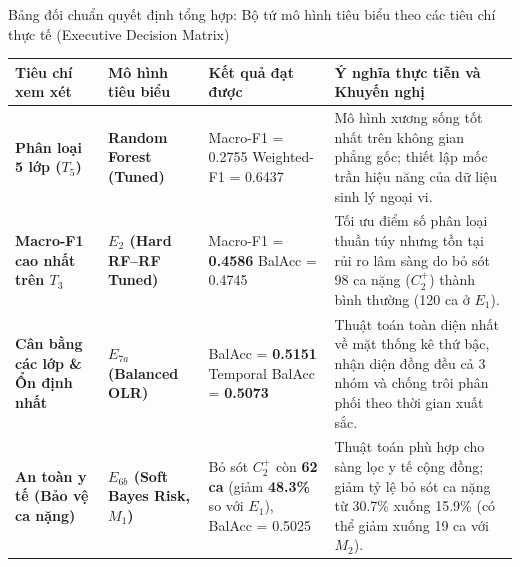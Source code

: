 \begin{table}{Bảng đối chuẩn quyết định tổng hợp: Bộ tứ mô hình tiêu biểu theo các tiêu chí thực tế (Executive Decision Matrix)}
\centering
\footnotesize
\setlength{\tabcolsep}{4pt}
\label{tab:executive-decision-matrix}
\begin{tabularx}{\textwidth}{p{3.2cm} p{3.0cm} p{3.2cm} X}
\toprule
\textbf{Tiêu chí xem xét} & \textbf{Mô hình tiêu biểu} & \textbf{Kết quả đạt được} & \textbf{Ý nghĩa thực tiễn và Khuyến nghị} \\
\midrule
\textbf{Phân loại 5 lớp ($T_5$)} & \textbf{Random Forest (Tuned)} & Macro-F1 = 0.2755 \newline Weighted-F1 = 0.6437 & Mô hình xương sống tốt nhất trên không gian phẳng gốc; thiết lập mốc trần hiệu năng của dữ liệu sinh lý ngoại vi. \\
\midrule
\textbf{Macro-F1 cao nhất trên $T_3$} & \textbf{$E_2$ (Hard RF--RF Tuned)} & Macro-F1 = \textbf{0.4586} \newline BalAcc = 0.4745 & Tối ưu điểm số phân loại thuần túy nhưng tồn tại rủi ro lâm sàng do bỏ sót 98 ca nặng ($C_2^+$) thành bình thường (120 ca ở $E_1$). \\
\midrule
\textbf{Cân bằng các lớp \& Ổn định nhất} & \textbf{$E_{7a}$ (Balanced OLR)} & BalAcc = \textbf{0.5151} \newline Temporal BalAcc = \textbf{0.5073} & Thuật toán toàn diện nhất về mặt thống kê thứ bậc, nhận diện đồng đều cả 3 nhóm và chống trôi phân phối theo thời gian xuất sắc. \\
\midrule
\textbf{An toàn y tế (Bảo vệ ca nặng)} & \textbf{$E_{6b}$ (Soft Bayes Risk, $M_1$)} & Bỏ sót $C_2^+$ còn \textbf{62 ca} \newline (giảm \textbf{48.3\%} so với $E_1$), BalAcc = 0.5025 & Thuật toán phù hợp cho sàng lọc y tế cộng đồng; giảm tỷ lệ bỏ sót ca nặng từ 30.7\% xuống 15.9\% (có thể giảm xuống 19 ca với $M_2$). \\
\bottomrule
\end{tabularx}
\end{table}
